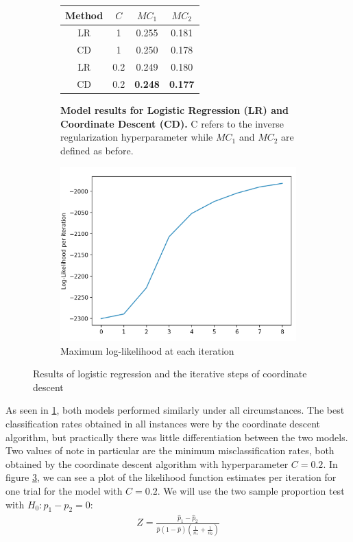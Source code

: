 \documentclass{article} %
\begin{document}
\begin{figure}[htb]
\centering
\begin{subfigure}{.5\textwidth}
  \centering

\begin{tabular}{|c|c|c|c|} 
\hline
Method & $C$ & $MC_1$ & $MC_2$ \\
\hline\hline
LR & 1 & 0.255 & 0.181 \\
\hline
CD & 1 & 0.250 & 0.178 \\
\hline
LR & 0.2 & 0.249 & 0.180 \\
\hline
CD & 0.2 & \textbf{0.248} & \textbf{0.177} \\
\hline
\end{tabular}
\caption{\textbf{Model results for Logistic Regression (LR) and Coordinate Descent (CD).} C refers to the inverse regularization hyperparameter while $MC_1$ and $MC_2$ are defined as before.}
\label{fig2:sub1}
\end{subfigure}%
\begin{subfigure}{.5\textwidth}
  \centering
  \includegraphics[width=0.9\linewidth]{log-likelihood}
  \caption{Maximum log-likelihood at each iteration}
  \label{fig2:sub2}
\end{subfigure}
\caption{Results of logistic regression and the iterative steps of coordinate descent}
\vspace*{-5mm}
\end{figure}

As seen in \ref{fig2:sub1}, both models performed similarly under all circumstances. The best classification rates obtained in all instances were by the coordinate descent algorithm, but practically there was little differentiation between the two models. Two values of note in particular are the minimum misclassification rates, both obtained by the coordinate descent algorithm with hyperparameter $C=0.2$. In figure \ref{fig2:sub2}, we can see a plot of the likelihood function estimates per iteration for one trial for the model with $C=0.2$. We will use the two sample proportion test with $H_0: p_1-p_2 = 0$:
\begin{align*}
Z = \frac{\hat{p}_1 - \hat{p}_2}{\hat{p}(1 - \hat{p})(\frac{1}{n_1} + \frac{1}{n_2})}
\end{align*}
\end{document}
